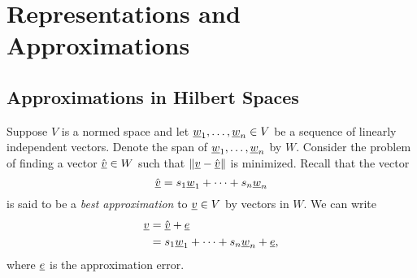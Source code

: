 \chapter{Representations and Approximations}

\section{Approximations in Hilbert Spaces}

Suppose $V$ is a normed space and let $\underline{w}_1, \ldots, \underline{w}_n \in V$ be a sequence of linearly independent vectors.
Denote the span of $\underline{w}_1, \ldots, \underline{w}_n$ by $W$.
Consider the problem of finding a vector $\hat{\underline{v}} \in W$ such that $\left\| \underline{v} - \hat{\underline{v}} \right\|$ is minimized.
Recall that the vector
\begin{equation*}
\hat{\underline{v}} = s_1 \underline{w}_1 + \cdots + s_n \underline{w}_n
\end{equation*}
is said to be a \emph{best approximation} to $\underline{v} \in V$ by vectors in $W$.
We can write
\begin{equation*}
\begin{split}
\underline{v} &= \hat{\underline{v}} + \underline{e} \\
&= s_1 \underline{w}_1 + \cdots + s_n \underline{w}_n + \underline{e},
\end{split}
\end{equation*}
where $\underline{e}$ is the approximation error.


